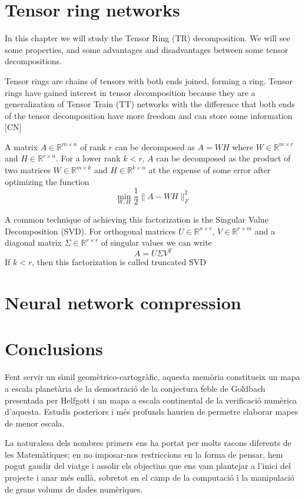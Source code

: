 \documentclass[11pt,a4paper,openright,oneside]{book}
\numberwithin{equation}{section}
\begin{document}
\chapter{Tensor ring networks}
In this chapter we will study the Tensor Ring (TR) decomposition. We will see some properties, and some advantages
and disadvantages between some tensor decompositions.

Tensor rings are chains of tensors with both ends joined, forming a ring. Tensor rings
have gained interest in tensor decomposition because they are a generalization of Tensor Train (TT) networks with
the difference that both ends of the tensor decomposition have more freedom and can store some information [CN]

A matrix $A \in \mathbb{R}^{m\times n}$ of rank $r$ can be decomposed as $A = WH$ where $W \in \mathbb{R}^{m \times r}$ and
$H \in \mathbb{R}^{r \times n}$. For a lower rank $k < r$, $A$ can be decomposed as the product of two matrices 
$W \in \mathbb{R}^{m \times k}$ and $H \in \mathbb{R}^{k \times n}$ at the expense of some error after optimizing the function
$$\min_{W, H} \frac{1}{2} \|A - WH\|^2_F$$

A common technique of achieving this factorization is the Singular Value Decomposition
(SVD). For orthogonal matrices $U \in \mathbb{R}^{n \times r}$, $V \in \mathbb{R}^{r \times m}$ and a
diagonal matrix $\Sigma \in \mathbb{R}^{r \times r}$ of singular values we can write
$$A = U\Sigma V^T$$
If $k < r$, then this factorization is called truncated SVD
\chapter{Neural network compression}

\chapter{Conclusions}

Fent servir un s\'{\i}mil geom\`etrico-cartogr\`afic, aquesta mem\`oria constitueix un mapa a escala planet\`aria de la demostraci\'o de la conjectura feble de Goldbach presentada per Helfgott i un mapa a escala continental de la verificaci\'o num\`erica d'aquesta. Estudis posteriors i m\'es profunds haurien de permetre elaborar mapes de menor escala.

La naturalesa dels nombres primers ens ha portat per molts racons diferents de les Matem\`atiques; en no imposar-nos restriccions en la forma de pensar, hem pogut gaudir del viatge i assolir els objectius que ens vam plantejar a l'inici del projecte i anar m\'es enll\`a, sobretot en el camp de la computaci\'o i la manipulaci\'o de grans volums de dades num\`eriques.
\end{document}
